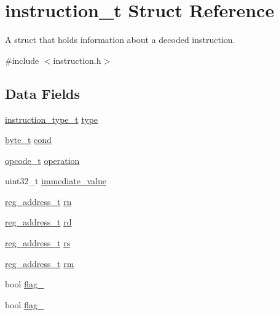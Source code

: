 \hypertarget{structinstruction__t}{}\section{instruction\+\_\+t Struct Reference}
\label{structinstruction__t}


A struct that holds information about a decoded instruction.  




{\ttfamily \#include $<$instruction.\+h$>$}

\subsection*{Data Fields}
\begin{DoxyCompactItemize}
\item 
\hyperlink{global_8h_aaba7165f28fb81b63cf5b0f1f9dcb40c}{instruction\+\_\+type\+\_\+t} \hyperlink{structinstruction__t_a3692cf5692ee00e944ee0cb5e69190e7}{type}
\item 
\hyperlink{global_8h_a0661d7d1353e0bca70c64563f635b034}{byte\+\_\+t} \hyperlink{structinstruction__t_aafe48ca203b375c2b6373abd11192c3f}{cond}
\item 
\hyperlink{global_8h_a8d0559dcae6e251ff5663e79d5581c7d}{opcode\+\_\+t} \hyperlink{structinstruction__t_ae29eba9c0dfbec4abcd24cf4a927d2b7}{operation}
\item 
uint32\+\_\+t \hyperlink{structinstruction__t_a6137fca8ba59012415bd91175ecbc0c2}{immediate\+\_\+value}
\item 
\hyperlink{global_8h_a462493a8f034b6ade38b69c49a39f52a}{reg\+\_\+address\+\_\+t} \hyperlink{structinstruction__t_a5ecf8ae8f3708affd90f22df5af80881}{rn}
\item 
\hyperlink{global_8h_a462493a8f034b6ade38b69c49a39f52a}{reg\+\_\+address\+\_\+t} \hyperlink{structinstruction__t_a8ab8a544fae4f96f3ebf0b8b36ac3e1d}{rd}
\item 
\hyperlink{global_8h_a462493a8f034b6ade38b69c49a39f52a}{reg\+\_\+address\+\_\+t} \hyperlink{structinstruction__t_a221c733fee7743d19a2468541eb3a6f2}{rs}
\item 
\hyperlink{global_8h_a462493a8f034b6ade38b69c49a39f52a}{reg\+\_\+address\+\_\+t} \hyperlink{structinstruction__t_aeff2b2015b47eb6c511d57c058435fb3}{rm}
\item 
bool \hyperlink{structinstruction__t_a2d1e7a105576c5bb98d45a51ef3d2e03}{flag\+\_}
\item 
bool \hyperlink{structinstruction__t_a5e38a859429a96a7db9fbcbd452f1a70}{flag\+\_}

\end{DoxyCompactItemize}
